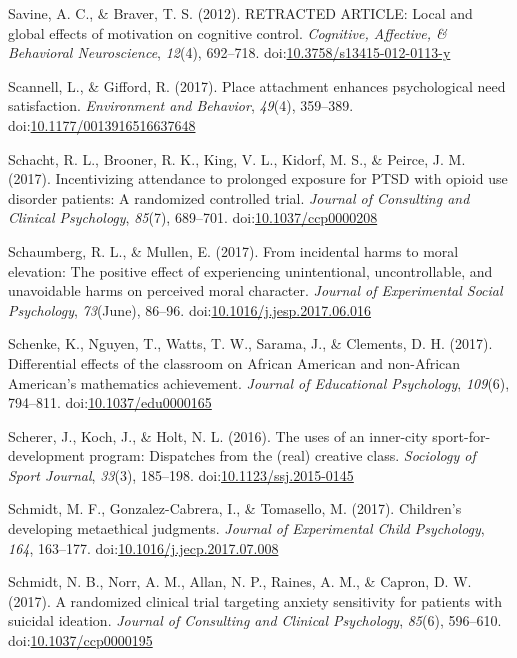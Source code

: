 \documentclass[english,man]{apa6}
\begin{document}
\hypertarget{ref-Savine2012}{}
Savine, A. C., \& Braver, T. S. (2012). RETRACTED ARTICLE: Local and
global effects of motivation on cognitive control. \emph{Cognitive,
Affective, \& Behavioral Neuroscience}, \emph{12}(4), 692--718.
doi:\href{https://doi.org/10.3758/s13415-012-0113-y}{10.3758/s13415-012-0113-y}

\hypertarget{ref-Scannell2017}{}
Scannell, L., \& Gifford, R. (2017). Place attachment enhances
psychological need satisfaction. \emph{Environment and Behavior},
\emph{49}(4), 359--389.
doi:\href{https://doi.org/10.1177/0013916516637648}{10.1177/0013916516637648}

\hypertarget{ref-Schacht2017a}{}
Schacht, R. L., Brooner, R. K., King, V. L., Kidorf, M. S., \& Peirce,
J. M. (2017). Incentivizing attendance to prolonged exposure for PTSD
with opioid use disorder patients: A randomized controlled trial.
\emph{Journal of Consulting and Clinical Psychology}, \emph{85}(7),
689--701.
doi:\href{https://doi.org/10.1037/ccp0000208}{10.1037/ccp0000208}

\hypertarget{ref-Schaumberg2017}{}
Schaumberg, R. L., \& Mullen, E. (2017). From incidental harms to moral
elevation: The positive effect of experiencing unintentional,
uncontrollable, and unavoidable harms on perceived moral character.
\emph{Journal of Experimental Social Psychology}, \emph{73}(June),
86--96.
doi:\href{https://doi.org/10.1016/j.jesp.2017.06.016}{10.1016/j.jesp.2017.06.016}

\hypertarget{ref-Schenke2017}{}
Schenke, K., Nguyen, T., Watts, T. W., Sarama, J., \& Clements, D. H.
(2017). Differential effects of the classroom on African American and
non-African American's mathematics achievement. \emph{Journal of
Educational Psychology}, \emph{109}(6), 794--811.
doi:\href{https://doi.org/10.1037/edu0000165}{10.1037/edu0000165}

\hypertarget{ref-Scherer2016}{}
Scherer, J., Koch, J., \& Holt, N. L. (2016). The uses of an inner-city
sport-for-development program: Dispatches from the (real) creative
class. \emph{Sociology of Sport Journal}, \emph{33}(3), 185--198.
doi:\href{https://doi.org/10.1123/ssj.2015-0145}{10.1123/ssj.2015-0145}

\hypertarget{ref-Schmidt2017}{}
Schmidt, M. F., Gonzalez-Cabrera, I., \& Tomasello, M. (2017).
Children's developing metaethical judgments. \emph{Journal of
Experimental Child Psychology}, \emph{164}, 163--177.
doi:\href{https://doi.org/10.1016/j.jecp.2017.07.008}{10.1016/j.jecp.2017.07.008}

\hypertarget{ref-Schmidt2017a}{}
Schmidt, N. B., Norr, A. M., Allan, N. P., Raines, A. M., \& Capron, D.
W. (2017). A randomized clinical trial targeting anxiety sensitivity for
patients with suicidal ideation. \emph{Journal of Consulting and
Clinical Psychology}, \emph{85}(6), 596--610.
doi:\href{https://doi.org/10.1037/ccp0000195}{10.1037/ccp0000195}
\end{document}
